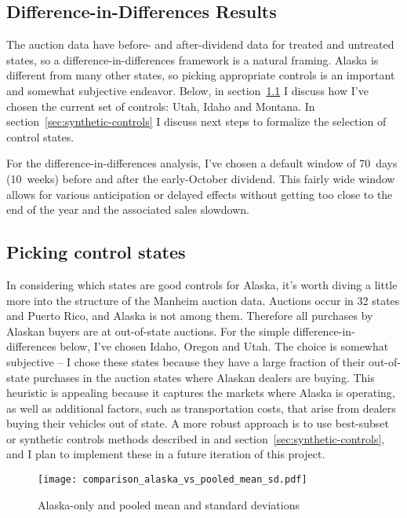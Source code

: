 \documentclass[11pt,letterpaper,oneside]{article}
\begin{document}
\begin{doublespacing}
\section[DD Results]{Difference-in-Differences Results}

The auction data have before- and after-dividend data for treated and untreated states, so a difference\hyp{}in\hyp{}differences framework is a natural framing.
Alaska is different from many other states, so picking appropriate controls is an important and somewhat subjective endeavor.
Below, in section~\ref{sec:picking-controls} I discuss how I've chosen the current set of controls: Utah, Idaho and Montana.
In section~\ref{sec:synthetic-controls} I discuss next steps to formalize the selection of control states.

For the difference\hyp{}in\hyp{}differences analysis, I've chosen a default window of 70~days (10~weeks) before and after the early-October dividend.
This fairly wide window allows for various anticipation or delayed effects without getting too close to the end of the year and the associated sales slowdown.


\subsection{Picking control states}
\label{sec:picking-controls}
In considering which states are good controls for Alaska, it's worth diving a little more into the structure of the Manheim auction data.
Auctions occur in 32 states and Puerto Rico, and Alaska is not among them.
Therefore all purchases by Alaskan buyers are at out-of-state auctions.
For the simple difference\hyp{}in\hyp{}differences below, I've chosen Idaho, Oregon and Utah.
The choice is somewhat subjective -- I chose these states because they have a large fraction of their out-of-state purchases in the auction states where Alaskan dealers are buying.
This heuristic is appealing because it captures the markets where Alaska is operating, as well as additional factors, such as transportation costs, that arise from dealers buying their vehicles out of state.
A more robust approach is to use best-subset or synthetic controls methods described in \textcite{DoudchenkoImbens2016DD} and section~\ref{sec:synthetic-controls}, and I plan to implement these in a future iteration of this project.

\begin{figure}[bth]
	\caption{Alaska-only and pooled mean and standard deviations}
	\label{fig:alaska_vs_pooled_mean_sd}
	\texttt{[image: comparison\_alaska\_vs\_pooled\_mean\_sd.pdf]}
\end{figure}


\end{doublespacing}
\end{document}
